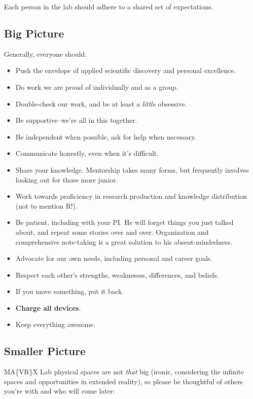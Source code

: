 \documentclass[]{tufte-book}
\providecommand{\tightlist}{%
  \setlength{\itemsep}{0pt}\setlength{\parskip}{0pt}}
\begin{document}
Each person in the lab should adhere to a shared set of expectations.

\hypertarget{big-picture}{%
\subsection{Big Picture}\label{big-picture}}

Generally, everyone should:

\begin{itemize}
\tightlist
\item
  Push the envelope of applied scientific discovery and personal excellence.
\item
  Do work we are proud of individually and as a group.
\item
  Double-check our work, and be at least a \emph{little} obsessive.
\item
  Be supportive--we're all in this together.
\item
  Be independent when possible, ask for help when necessary.
\item
  Communicate honestly, even when it's difficult.
\item
  Share your knowledge. Mentorship takes many forms, but frequently involves looking out for those more junior.
\item
  Work towards proficiency in research production and knowledge distribution (not to mention R!).
\item
  Be patient, including with your PI. He will forget things you just talked about, and repeat some stories over and over. Organization and comprehensive note-taking is a great solution to his absent-mindedness.
\item
  Advocate for our own needs, including personal and career goals.
\item
  Respect each other's strengths, weaknesses, differences, and beliefs.
\item
  If you move something, put it back.
\item
  \textbf{Charge all devices}.
\item
  Keep everything awesome.
\end{itemize}

\hypertarget{smaller-picture}{%
\subsection{Smaller Picture}\label{smaller-picture}}

MA\{VR\}X Lab physical spaces are not \emph{that} big (ironic, considering the infinite spaces and opportunities in extended reality), so please be thoughtful of others you're with and who will come later:
\end{document}
